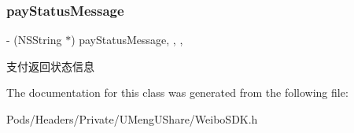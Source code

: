 \subsubsection{\texorpdfstring{pay\+Status\+Message}{payStatusMessage}}
{\footnotesize\ttfamily -\/ (N\+S\+String $\ast$) pay\+Status\+Message\hspace{0.3cm}{\ttfamily [read]}, {\ttfamily [write]}, {\ttfamily [nonatomic]}, {\ttfamily [strong]}}

支付返回状态信息 

The documentation for this class was generated from the following file\+:\begin{DoxyCompactItemize}
\item 
Pods/\+Headers/\+Private/\+U\+Meng\+U\+Share/Weibo\+S\+D\+K.\+h\end{DoxyCompactItemize}
